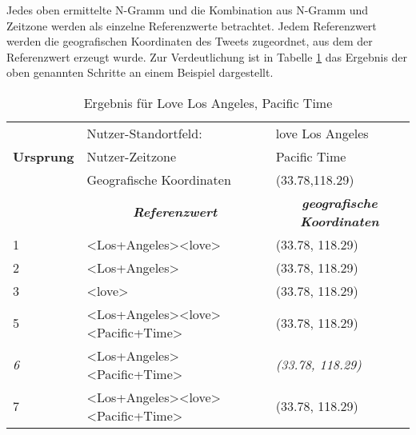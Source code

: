 			Jedes oben ermittelte N-Gramm und die Kombination aus N-Gramm und Zeitzone werden als einzelne Referenzwerte betrachtet. 
			Jedem Referenzwert werden die geografischen Koordinaten des Tweets zugeordnet, aus dem der Referenzwert erzeugt wurde.
			Zur Verdeutlichung ist in Tabelle \ref{tab:bspWerteAusEinemTweet} das Ergebnis der oben genannten Schritte an einem Beispiel dargestellt. 

				\begin{table}[h]
				\begin{tabular}{|l|l|l|}
				\hline
				\textbf{}         & Nutzer-Standortfeld:                                                                       & love Los Angeles                                                \\ \cline{2-3} 
				\textbf{Ursprung} & Nutzer-Zeitzone                                                                            & Pacific Time                                                    \\ \cline{2-3} 
				\textbf{}         & Geografische Koordinaten                                                                   & (33.78,118.29)                                                  \\ \hline
				                  & \multicolumn{1}{c|}{\textit{\textbf{Referenzwert}}}                                        & \multicolumn{1}{c|}{\textit{\textbf{geografische Koordinaten}}} \\ \hline
				1                 & \textless Los+Angeles\textgreater\textless love\textgreater                                  & (33.78, 118.29)                                                 \\ \hline
				2                 & \textless Los+Angeles\textgreater                                                           & (33.78, 118.29)                                                 \\ \hline
				3                 & \textless love\textgreater                                                                  & (33.78, 118.29)                                                 \\ \hline
				5                 & \textless Los+Angeles\textgreater\textless love\textgreater\textless Pacific+Time\textgreater & (33.78, 118.29)                                                 \\ \hline
				\textit{6}        & \textless Los+Angeles\textgreater\textless Pacific+Time\textgreater                          & \textit{(33.78, 118.29)}                                        \\ \hline
				7                 & \textless Los+Angeles\textgreater\textless love\textgreater\textless Pacific+Time\textgreater & (33.78, 118.29)                                                 \\ \hline
				\end{tabular}
				\caption{Ergebnis für Love Los Angeles, Pacific Time}
					\label{tab:bspWerteAusEinemTweet}
				\end{table}


